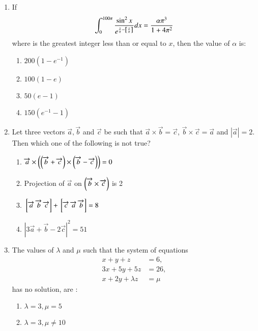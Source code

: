 \documentclass[journal]{IEEEtran}
\begin{document}
\begin{enumerate}
{}
\item{
If  $$\int_0^{100\pi} \frac{\sin^2 x}{e^{\frac{x}{\pi} - {}\left[\frac{x}{\pi}\right]}} dx = \frac{\alpha \pi^3}{1+ 4\pi^2}$$
where  is the greatest integer less than or equal to $x$, then the value of $\alpha$ is:
\begin{multicols}{4}
\begin{enumerate}
\item $200(1 - e ^{-1})$
\item $100(1 - e)$
\item $50(e - 1)$
\item $150(e^{-1} - 1)$
\end{enumerate}
\end{multicols}
}
\item{
Let three vectors $\overrightarrow{a},\overrightarrow{b}$ and $\overrightarrow{c}$ be such that $\overrightarrow{a} \times \overrightarrow{b} = \overrightarrow{c}$, $\overrightarrow{b} \times \overrightarrow{c} =\overrightarrow{a}$ and $|\overrightarrow{a}| = 2$. Then which one of the following is not true?
\begin{multicols}{2}
\begin{enumerate}
\item $\overrightarrow{a}\times\left(\left(\overrightarrow{b}+\overrightarrow{c}\right)\times\left(\overrightarrow{b}-\overrightarrow{c}\right)\right) = 0$
\item Projection of $\overrightarrow{a}$ on $\left(\overrightarrow{b}\times\overrightarrow{c}\right)$ is 2
\item ${}\left[\overrightarrow{a}\text{ }\overrightarrow{b}\text{ }\overrightarrow{c}\right]+{}\left[\overrightarrow{c}\text{ }\overrightarrow{a}\text{ }\overrightarrow{b}\right] =8$
\item $|3\overrightarrow{a}+\overrightarrow{b}  -2\overrightarrow{c}|^2 = 51$
\end{enumerate}
\end{multicols}
}
\item{
The values of $\lambda$ and $\mu$ such that the system of equations 
\begin{align*}
x+y+z &= 6, \\
3x+5y+5z &= 26, \\
x + 2y + \lambda z &= \mu
\end{align*}
has no solution, are : 
\begin{multicols}{4}
\begin{enumerate}
\item $\lambda = 3, \mu = 5$
\item $\lambda = 3, \mu \neq 10$

\end{enumerate}
\end{multicols}}
\end{enumerate}
\end{document}
